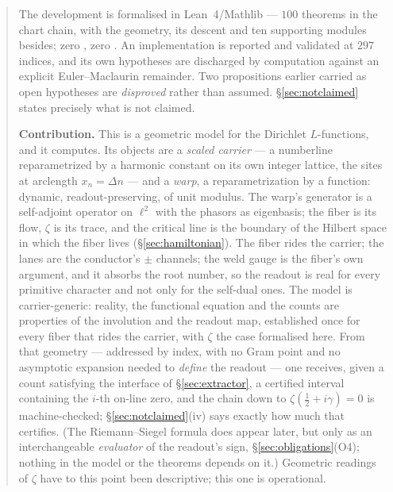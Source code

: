 \documentclass[11pt]{article}
\theoremstyle{plain}
\theoremstyle{definition}
\theoremstyle{remark}
\newcommand{\lean}[1]{\texttt{\detokenize{#1}}}
\begin{document}
\begin{abstract}
The development is formalised in Lean~4/Mathlib --- $100$ theorems in the chart chain,
with the geometry, its descent and ten supporting modules besides; zero \lean{sorry},
zero \lean{axiom}. An implementation is reported and validated at $297$ indices, and
its own hypotheses are discharged by computation against an explicit Euler--Maclaurin
remainder. Two propositions earlier carried as open hypotheses are \emph{disproved}
rather than assumed. \S\ref{sec:notclaimed} states precisely what is not claimed.

\medskip
\noindent\textbf{Contribution.} This is a geometric model for the Dirichlet
$L$-functions, and it computes. Its objects are a \emph{scaled carrier} --- a
numberline reparametrized by a harmonic constant on its own integer lattice, the
sites at arclength $x_n=\Delta n$ --- and a \emph{warp}, a reparametrization by a
function: dynamic, readout-preserving, of unit modulus. The warp's generator is a
self-adjoint operator on $\ell^2$ with the phasors as eigenbasis; the fiber is its flow,
$\zeta$ is its trace, and the critical line is the boundary of the Hilbert space in which
the fiber lives (\S\ref{sec:hamiltonian}). The fiber rides the carrier;
the lanes are the conductor's $\pm$ channels; the weld gauge is the fiber's own
argument, and it absorbs the root number, so the readout is real for every primitive
character and not only for the self-dual ones. The model is carrier-generic: reality,
the functional equation and the counts are properties of the involution and the
readout map, established once for every fiber that rides the carrier, with $\zeta$ the
case formalised here. From that geometry --- addressed by index, with no Gram point and
no asymptotic expansion needed to \emph{define} the readout --- one receives, given a
count satisfying the interface of \S\ref{sec:extractor}, a certified interval containing
the $i$-th on-line zero, and the chain down to $\zeta(\tfrac12+i\gamma)=0$ is
machine-checked; \S\ref{sec:notclaimed}(iv) says exactly how much that certifies. (The Riemann--Siegel formula does appear
later, but only as an interchangeable \emph{evaluator} of the readout's sign,
\S\ref{sec:obligations}(O4); nothing in the model or the theorems depends on it.)
Geometric readings of $\zeta$ have to this point been descriptive; this one is
operational.


\end{abstract}
\end{document}

